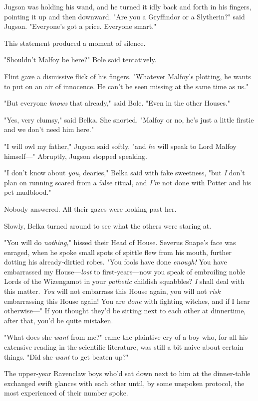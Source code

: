 Jugson was holding his wand, and he turned it idly back and forth in his 
fingers, pointing it up and then downward. "Are you a Gryffindor or a 
Slytherin?" said Jugson. "Everyone's got a price. Everyone smart."

This statement produced a moment of silence.

"Shouldn't Malfoy be here?" Bole said tentatively.

Flint gave a dismissive flick of his fingers. "Whatever Malfoy's plotting, he 
wants to put on an air of innocence. He can't be seen missing at the same time 
as us."

"But everyone \emph{knows} that already," said Bole. "Even in the other Houses."

"Yes, very clumsy," said Belka. She snorted. "Malfoy or no, he's just a little 
firstie and we don't need him here."

"I will owl my father," Jugson said softly, "and \emph{he} will speak to Lord 
Malfoy himself---" Abruptly, Jugson stopped speaking.

"I don't know about \emph{you}, dearies," Belka said with fake sweetness, "but 
\emph{I} don't plan on running scared from a false ritual, and \emph{I'm} not 
done with Potter and his pet mudblood."

Nobody answered. All their gazes were looking past her.

Slowly, Belka turned around to see what the others were staring at.

"You will do \emph{nothing,}" hissed their Head of House. Severus Snape's face 
was enraged, when he spoke small spots of spittle flew from his mouth, further 
dotting his already-dirtied robes. "You fools have done \emph{enough!} You have 
embarrassed my House---\emph{lost} to first-years---now you speak of embroiling 
noble Lords of the Wizengamot in your \emph{pathetic} childish squabbles? 
\emph{I} shall deal with this matter. \emph{You} will not embarrass this House 
again, you will not \emph{risk} embarrassing this House again! You are 
\emph{done} with fighting witches, and if I hear otherwise---"
\sbreak
If you thought they'd be sitting next to each other at dinnertime, after that, 
you'd be quite mistaken.

"What does she \emph{want} from me?" came the plaintive cry of a boy who, for 
all his extensive reading in the scientific literature, was still a bit naive 
about certain things. "Did she \emph{want} to get beaten up?"

The upper-year Ravenclaw boys who'd sat down next to him at the dinner-table 
exchanged swift glances with each other until, by some unspoken protocol, the 
most experienced of their number spoke.

